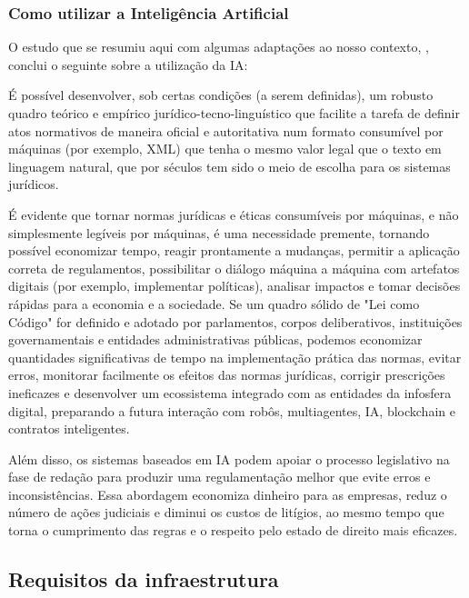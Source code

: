 \subsubsection{Como utilizar a Inteligência Artificial}

O estudo que se resumiu aqui com algumas adaptações ao nosso contexto, \cite{PFPD22}, conclui o seguinte sobre a utilização da IA:

\begin{quoting}
    É possível desenvolver, sob certas condições (a serem definidas), um robusto quadro teórico e empírico 
    jurídico-tecno-linguístico que facilite a tarefa de definir atos normativos de maneira oficial e autoritativa num 
    formato consumível por máquinas (por exemplo, XML) que tenha o mesmo valor legal que o texto em linguagem natural, 
    que por séculos tem sido o meio de escolha para os sistemas jurídicos.

    É evidente que tornar normas jurídicas e éticas consumíveis por máquinas, e não simplesmente legíveis por máquinas, 
    é uma necessidade premente, tornando possível economizar tempo, reagir prontamente a mudanças, permitir a aplicação 
    correta de regulamentos, possibilitar o diálogo máquina a máquina com artefatos digitais (por exemplo, implementar 
    políticas), analisar impactos e tomar decisões rápidas para a economia e a sociedade. 
    Se um quadro sólido de "Lei como Código" for definido e adotado por parlamentos, corpos deliberativos, 
    instituições governamentais e entidades administrativas públicas, podemos economizar quantidades significativas de 
    tempo na implementação prática das normas, evitar erros, monitorar facilmente os efeitos das normas jurídicas, 
    corrigir prescrições ineficazes e desenvolver um ecossistema integrado com as entidades da infosfera digital, 
    preparando a futura interação com robôs, multiagentes, IA, blockchain e contratos inteligentes.
    
    Além disso, os sistemas baseados em IA podem apoiar o processo legislativo na fase de redação para produzir uma 
    regulamentação melhor que evite erros e inconsistências. Essa abordagem economiza dinheiro para as empresas, reduz o 
    número de ações judiciais e diminui os custos de litígios, ao mesmo tempo que torna o cumprimento das regras e o 
    respeito pelo estado de direito mais eficazes.
\end{quoting}    


\subsection{Requisitos da infraestrutura}

